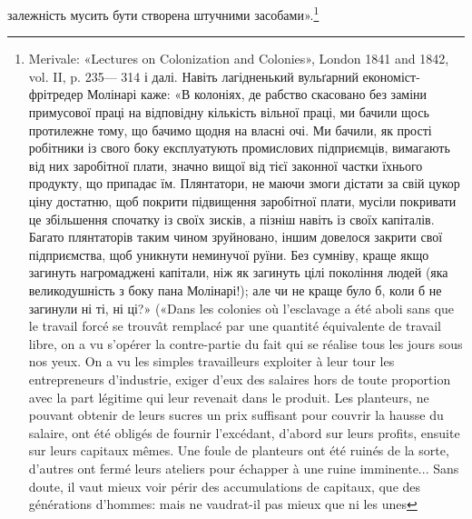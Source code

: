 залежність мусить бути створена штучними засобами».\footnote{
Merivale: «Lectures on Colonization and Colonies», London 1841 and 1842, vol. II, p. 235— 314 і
далі. Навіть лагідненький вульґарний економіст-фрітредер Молінарі каже: «В колоніях, де рабство
скасовано без заміни примусової праці на відповідну кількість вільної праці, ми бачили щось
протилежне тому, що бачимо щодня на власні очі. Ми
бачили, як прості робітники із свого боку експлуатують промислових підприємців, вимагають від них
заробітної плати, значно вищої від тієї законної частки їхнього продукту, що припадає їм.
Плянтатори, не маючи змоги дістати за свій цукор ціну достатню, щоб покрити підвищення заробітної
плати, мусіли покривати це збільшення спочатку із своїх зисків, а пізніш навіть із своїх капіталів.
Багато плянтаторів таким
чином зруйновано, іншим довелося закрити свої підприємства, щоб уникнути
неминучої руїни. Без сумніву, краще якщо загинуть нагромаджені капітали, ніж як загинуть цілі
покоління людей (яка великодушність з боку пана Молінарі!); але чи не краще було б, коли б не
загинули ні ті, ні ці?» («Dans les colonies où l’esclavage a été aboli sans que le travail forcé se
trouvât remplacé par une quantité équivalente de travail libre,
on a vu s’opérer la contre-partie du fait qui se réalise tous les jours sous nos yeux. On a vu les
simples travailleurs exploiter à leur tour les entrepreneurs d’industrie, exiger d’eux des salaires
hors de toute proportion avec la part légitime qui leur revenait dans le produit. Les planteurs, ne
pouvant obtenir de leurs sucres un prix suffisant pour couvrir la hausse du salaire, ont été obligés
de fournir l’excédant, d’abord sur leurs profits, ensuite sur leurs
capitaux mêmes. Une foule de planteurs ont été ruinés de la sorte, d’autres ont fermé leurs ateliers
pour échapper à une ruine imminente... Sans doute, il vaut mieux voir périr des accumulations de
capitaux, que des générations d'hommes: mais ne vaudrat-il pas mieux que ni les unes
}